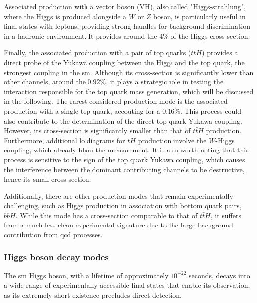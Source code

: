 Associated production with a vector boson (VH), also called "Higgs-strahlung", where the Higgs is produced alongside a $W$ or $Z$ boson, is particularly useful in final states with leptons, providing strong handles for background discrimination in a hadronic environment. It provides around the $4\%$ of the Higgs cross-section.

Finally, the associated production with a pair of top quarks ($t\bar{t}H$) provides a direct probe of the Yukawa coupling between the Higgs and the top quark, the strongest coupling in the \acrshort{sm}. Although its cross-section is significantly lower than other channels, around the $0.92\%$, it plays a strategic role in testing the interaction responsible for the top quark mass generation, which will be discussed in the following.
The rarest considered production mode is the associated production with a single top quark, accouting for a $0.16\%$. This process could also contribute to the determination of the direct top quark Yukawa coupling. However, its cross-section is significantly smaller than that of \( t\bar{t}H \) production. Furthermore, additional \acrshort{lo} diagrams for \( tH \) production involve the \( W \)-Higgs coupling, which already blurs the measurement. It is also worth noting that this process is sensitive to the sign of the top quark Yukawa coupling, which causes the interference between the dominant contributing channels to be destructive, hence its small cross-section.

Additionally, there are other production modes that remain experimentally challenging, such as Higgs production in association with bottom quark pairs, \( b\bar{b}H \). While this mode has a cross-section comparable to that of \( t\bar{t}H \), it suffers from a much less clean experimental signature due to the large background contribution from \acrshort{qcd} processes.

\subsubsection*{Higgs boson decay modes}
\label{sec:higgs_decay}

The \acrshort{sm} Higgs boson, with a lifetime of approximately \(10^{-22}\) seconds, decays into a wide range of experimentally accessible final states that enable its observation, as its extremely short existence precludes direct detection.

